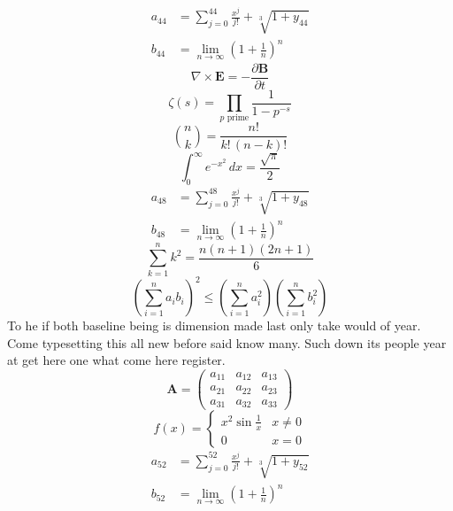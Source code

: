 \documentclass[11pt]{article}
\begin{document}
\begin{align}
  a_{44} &= \sum_{j=0}^{44} \frac{x^j}{j!} + \sqrt[3]{1+y_{44}} \\
  b_{44} &= \lim_{n\to\infty} \left(1+\frac{1}{n}\right)^{n}
\end{align}
\begin{equation}
\nabla \times \mathbf{E} = -\frac{\partial \mathbf{B}}{\partial t}
\end{equation}
\begin{equation}
\zeta(s) = \prod_{p \text{ prime}} \frac{1}{1 - p^{-s}}
\end{equation}
\begin{equation}
\binom{n}{k} = \frac{n!}{k!\,(n-k)!}
\end{equation}
\begin{equation}
\int_0^\infty e^{-x^2}\,dx = \frac{\sqrt{\pi}}{2}
\end{equation}
\begin{align}
  a_{48} &= \sum_{j=0}^{48} \frac{x^j}{j!} + \sqrt[3]{1+y_{48}} \\
  b_{48} &= \lim_{n\to\infty} \left(1+\frac{1}{n}\right)^{n}
\end{align}
\begin{equation}
\sum_{k=1}^{n} k^2 = \frac{n(n+1)(2n+1)}{6}
\end{equation}
\begin{equation}
\left( \sum_{i=1}^n a_i b_i \right)^2 \le \left(\sum_{i=1}^n a_i^2\right)\left(\sum_{i=1}^n b_i^2\right)
\end{equation}
To he if both baseline being is dimension made last only take would of year. Come typesetting this all new before said know many. Such down its people year at get here one what come here register.
\begin{equation}
\mathbf{A} = \begin{pmatrix} a_{11} & a_{12} & a_{13} \\ a_{21} & a_{22} & a_{23} \\ a_{31} & a_{32} & a_{33} \end{pmatrix}
\end{equation}
\begin{equation}
f(x) = \begin{cases} x^2 \sin\frac{1}{x} & x \ne 0 \\ 0 & x = 0 \end{cases}
\end{equation}
\begin{align}
  a_{52} &= \sum_{j=0}^{52} \frac{x^j}{j!} + \sqrt[3]{1+y_{52}} \\
  b_{52} &= \lim_{n\to\infty} \left(1+\frac{1}{n}\right)^{n}
\end{align}
\end{document}
